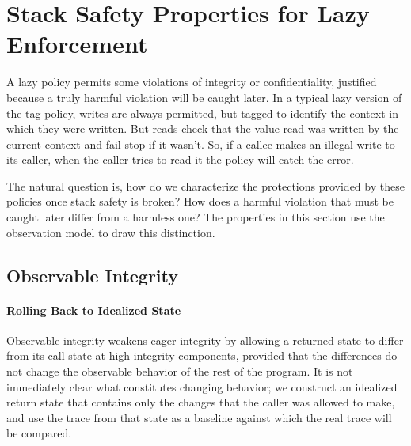 \documentclass[acmsmall,review,anonymous]{acmart}\settopmatter{printfolios=true,printccs=false,printacmref=false}
\begin{document}




\section{Stack Safety Properties for Lazy Enforcement}
\label{sec:lazy}

  A lazy policy permits some violations of integrity or confidentiality,
  justified because a truly harmful violation will be caught later.
  In a typical lazy version of the tag policy, writes are always permitted,
  but tagged to identify the context in which they were written. But reads
  check that the value read was written by the current context and fail-stop
  if it wasn't. So, if a callee makes an illegal write to its caller, when the
  caller tries to read it the policy will catch the error.

  The natural question is, how do we characterize the protections provided
  by these policies once stack safety is broken? How does a harmful violation
  that must be caught later differ from a harmless one? The properties in this
  section use the observation model to draw this distinction.



  \subsection{Observable Integrity}

    \paragraph{Rolling Back to Idealized State}
      Observable integrity weakens eager integrity by allowing a returned
      state to differ from its call state at high integrity components,
      provided that the differences do not change the observable behavior
      of the rest of the program. It is not immediately clear what constitutes
      changing behavior; we construct an idealized return state that contains
      only the changes that the caller was allowed to make, and use the trace
      from that state as a baseline against which the real trace will be
      compared.
\end{document}
